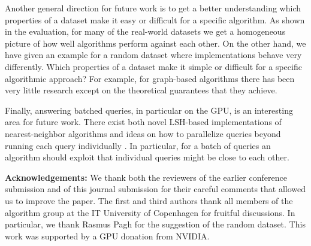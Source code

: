 Another general direction for future work is to get a better understanding which properties of a dataset make it easy or difficult for a specific algorithm. As shown in the evaluation, for many of the real-world datasets we get a homogeneous picture of how well algorithms perform against each other. On the other hand, we have given an example for a random dataset where implementations behave very differently. Which properties of a dataset make it simple or difficult
for a specific algorithmic approach? For example, for graph-based algorithms there has been very little research except \cite{Laarhoven18} on the theoretical guarantees that they achieve. 

Finally, answering batched queries, in particular on the GPU, is an interesting area for future work. There exist both novel LSH-based implementations \cite{WangSWR18} of nearest-neighbor algorithms and ideas on how to parallelize queries beyond running each query individually \cite{ChristianiPS18}. In particular, for a batch of queries an algorithm should exploit that individual queries might be close to each other.  




\smallskip

\noindent\textbf{Acknowledgements:} We thank both the reviewers of the earlier conference submission 
and of this journal submission for their careful comments
that allowed us to improve the paper. The first and third authors thank all members 
of the algorithm group at the IT University of Copenhagen for fruitful discussions.
In particular, we thank Rasmus Pagh for the suggestion of the random dataset.
This work was supported by a GPU donation from NVIDIA.

